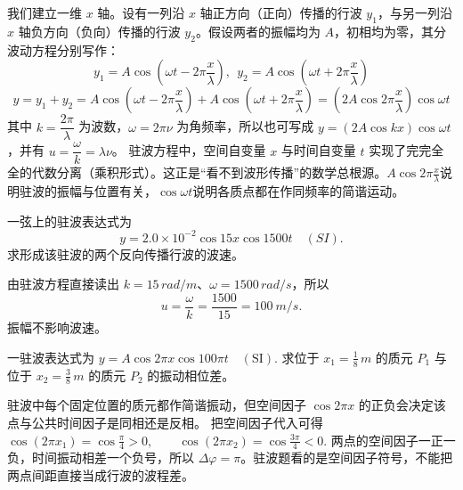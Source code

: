 \documentclass[lang=cn,11pt]{elegantbook}
\begin{document}
\begin{theorem}[驻波方程]
我们建立一维 $x$ 轴。设有一列沿 $x$ 轴正方向（正向）传播的行波 $y_1$，与另一列沿 $x$ 轴负方向（负向）传播的行波 $y_2$。假设两者的振幅均为 $A$，初相均为零，其分波动方程分别写作：$$y_1 = A \cos \left( \omega t - 2\pi \frac{x}{\lambda} \right),~~y_2 = A \cos \left( \omega t + 2\pi \frac{x}{\lambda} \right)$$
$$y = y_1 + y_2 = A \cos \left( \omega t - 2\pi \frac{x}{\lambda} \right) + A \cos \left( \omega t + 2\pi \frac{x}{\lambda} \right) = \left( 2A \cos 2\pi \frac{x}{\lambda} \right) \cos \omega t$$
其中 \(k=\dfrac{2\pi}{\lambda}\) 为波数，\(\omega=2\pi\nu\) 为角频率，所以也可写成 \(y=(2A\cos kx)\cos\omega t\)，并有 \(u=\dfrac{\omega}{k}=\lambda\nu\)。
驻波方程中，空间自变量 $x$ 与时间自变量 $t$ 实现了完完全全的代数分离（乘积形式）。这正是“看不到波形传播”的数学总根源。$A \cos 2\pi \frac{x}{\lambda}$说明驻波的振幅与位置有关，$\cos\omega t$说明各质点都在作同频率的简谐运动。
\end{theorem}

\begin{exercise}
一弦上的驻波表达式为
\[
y=2.0\times10^{-2}\cos 15x\cos1500t\quad(\si{SI}).
\]
求形成该驻波的两个反向传播行波的波速。
\end{exercise}

\begin{solution}
由驻波方程直接读出 \(k=15\,\si{rad/m}\)、\(\omega=1500\,\si{rad/s}\)，所以
\[
u=\frac{\omega}{k}=\frac{1500}{15}=\SI{100}{m/s}.
\]
振幅不影响波速。
\end{solution}

\begin{exercise}
一驻波表达式为
 \(y=A\cos 2\pi x\cos 100\pi t\quad(\mathrm{SI}).\) 
求位于 \(x_1=\frac18\,\si{m}\) 的质元 \(P_1\) 与位于 \(x_2=\frac38\,\si{m}\) 的质元 \(P_2\) 的振动相位差。
\end{exercise}

\begin{solution}
驻波中每个固定位置的质元都作简谐振动，但空间因子 \(\cos 2\pi x\) 的正负会决定该点与公共时间因子是同相还是反相。
把空间因子代入可得
 \(\cos(2\pi x_1)=\cos\frac{\pi}{4}>0,\qquad \cos(2\pi x_2)=\cos\frac{3\pi}{4}<0.\) 
两点的空间因子一正一负，时间振动相差一个负号，所以 \(\Delta\varphi=\pi\)。驻波题看的是空间因子符号，不能把两点间距直接当成行波的波程差。
\end{solution}
\end{document}

